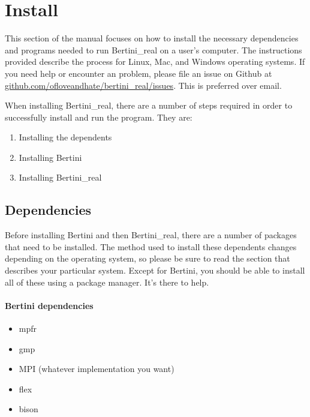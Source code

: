 
\section{Install}
\label{sec:installation}


This section of the manual focuses on how to install the necessary dependencies and programs needed to run Bertini\_real on a user's computer. The instructions provided describe the process for Linux, Mac, and Windows operating systems.  If you need help or encounter an problem, please file an issue on Github at 
\href{https://github.com/ofloveandhate/bertini_real/issues}{github.com/ofloveandhate/bertini\_real/issues}.  
This is preferred over email.

When installing Bertini\_real, there are a number of steps required in order to successfully install and run the program. They are:
\begin{enumerate}
\item Installing the \glspl{dependent}
\item Installing Bertini
\item Installing Bertini\_real
\end{enumerate}




\subsection{Dependencies}
\label{sec:deps}

Before installing Bertini and then Bertini\_real, there are a number of packages that need to be installed. The method used to install these \glspl{dependent} changes depending on the operating system, so please be sure to read the section that describes your particular system.  Except for Bertini, you should be able to install all of these using a package manager.  It's there to help.

\paragraph{Bertini dependencies}

\begin{itemize}[noitemsep]
\item \gls{mpfr}
\item \gls{gmp}
\item MPI (whatever implementation you want)
\item flex
\item bison
\end{itemize}


